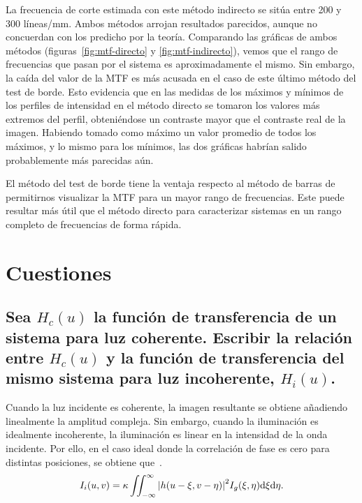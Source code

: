 \documentclass{./packages/optica-article}
\begin{document}
La frecuencia de corte estimada con este método indirecto se sitúa entre 200 y 300 líneas/mm. Ambos métodos arrojan resultados parecidos, aunque no concuerdan con los predicho por la teoría. Comparando las gráficas de ambos métodos (figuras~\ref{fig:mtf-directo} y \ref{fig:mtf-indirecto}), vemos que el rango de frecuencias que pasan por el sistema es aproximadamente el mismo. Sin embargo, la caída del valor de la MTF es más acusada en el caso de este último método del test de borde. Esto evidencia que en las medidas de los máximos y mínimos de los perfiles de intensidad en el método directo se tomaron los valores más extremos del perfil, obteniéndose un contraste mayor que el contraste real de la imagen. Habiendo tomado como máximo un valor promedio de todos los máximos, y lo mismo para los mínimos, las dos gráficas habrían salido probablemente más parecidas aún.

El método del test de borde tiene la ventaja respecto al método de barras de permitirnos visualizar la MTF para un mayor rango de frecuencias. Este puede resultar más útil que el método directo para caracterizar sistemas en un rango completo de frecuencias de forma rápida.






\section{Cuestiones}

\subsection{Sea $H_{c}(u)$ la función de transferencia de un sistema para luz coherente. Escribir la relación entre $H_{c}(u)$ y la función de transferencia del mismo sistema para luz incoherente, $H_{i}(u)$.}\label{sec:cuestion:incoherente}

Cuando la luz incidente es coherente, la imagen resultante se obtiene añadiendo linealmente la amplitud compleja. Sin embargo, cuando la iluminación es idealmente incoherente, la iluminación es linear en la intensidad de la onda incidente. Por ello, en el caso ideal donde la correlación de fase es cero para distintas posiciones, se obtiene que~\cite[p.~132--134]{goodman1996introduction}.
\nopagebreak
\begin{equation}
	I_{i}(u,v) = \kappa \iint_{-\infty}^{\infty}\abs{h(u - \xi, v- \eta)}^{2} I_{g}(\xi, \eta) \dd \xi \dd \eta.
\end{equation}
\end{document}
